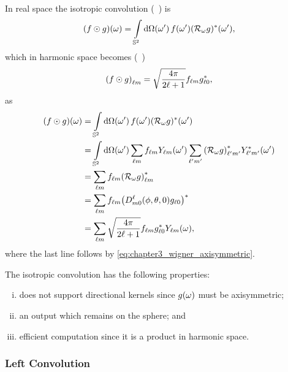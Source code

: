In real space the isotropic convolution (\eg{}~\autocite{McEwen2007,Wei2011,Kennedy2011}) is
%
\begin{equation}
	\pixel{(f \odot g)}
	= \integrateSphere{\omega'} \pixel[']{f} \pixel[']{\conj{(\rotation{\omega}g)}},
\end{equation}
%
which in harmonic space becomes (\eg{}~\autocite{McEwen2007})
%
\begin{equation}\label{eq:chapter3_isotropic_harmonic}
	\harmonic{(f \odot g)}
	= \sqrt{\inverseFactor} \harmonic{f} \conj{\axiHarmonic{g}},
\end{equation}
%
as
%
\begin{align}
	\pixel{(f \odot g)}
	 & = \integrateSphere{\omega'} \pixel[']{f} \pixel[']{\conj{(\rotation{\omega}g)}} \nonumber{}                                                                                           \\
	 & = \integrateSphere{\omega'} \harmonicSum \harmonic{f} \pixel[']{\harmonic{Y}} \harmonicSum['] \conj{\harmonic[']{(\rotation{\omega}g)}} \pixel[']{\conj{\harmonic[']{Y}}} \nonumber{} \\
	 & = \harmonicSum \harmonic{f} \conj{\harmonic{(\rotation{\omega}g)}} \nonumber                                                                                                          \\
	 & = \harmonicSum \harmonic{f} \conj{\big(\wigner{\ell}{m}{0}(\phi,\theta,0) \axiHarmonic{g}\big)} \nonumber{}                                                                           \\
	 & = \harmonicSum \sqrt{\inverseFactor} \harmonic{f} \conj{\axiHarmonic{g}} \pixel{\harmonic{Y}},
\end{align}
%
where the last line follows by \cref{eq:chapter3_wigner_axisymmetric}.

The isotropic convolution has the following properties:
%
\begin{enumerate}[(i),nosep]
	\item does not support directional kernels since \(\pixel{g}\) must be axisymmetric;
	\item an output which remains on the sphere; and
	\item efficient computation since it is a product in harmonic space.
\end{enumerate}

\subsubsection{Left Convolution}

